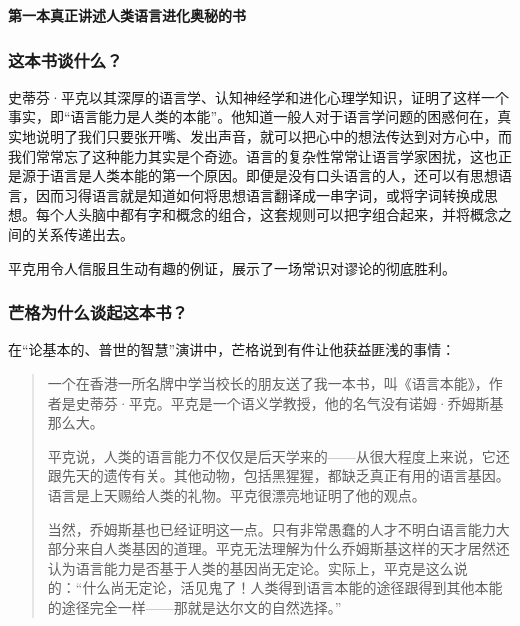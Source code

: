 \cleardoublepage
{}


\begin{BookSummaryBox}
\textbf{第一本真正讲述人类语言进化奥秘的书}
\par
\end{BookSummaryBox}

\subsubsection*{这本书谈什么？}

史蒂芬·平克以其深厚的语言学、认知神经学和进化心理学知识，证明了这样一个事实，即“语言能力是人类的本能”。他知道一般人对于语言学问题的困惑何在，真实地说明了我们只要张开嘴、发出声音，就可以把心中的想法传达到对方心中，而我们常常忘了这种能力其实是个奇迹。语言的复杂性常常让语言学家困扰，这也正是源于语言是人类本能的第一个原因。即便是没有口头语言的人，还可以有思想语言，因而习得语言就是知道如何将思想语言翻译成一串字词，或将字词转换成思想。每个人头脑中都有字和概念的组合，这套规则可以把字组合起来，并将概念之间的关系传递出去。
\par

平克用令人信服且生动有趣的例证，展示了一场常识对谬论的彻底胜利。
\par

\subsubsection*{芒格为什么谈起这本书？}

在“论基本的、普世的智慧”演讲中，芒格说到有件让他获益匪浅的事情：
\par

\begin{quotation}
一个在香港一所名牌中学当校长的朋友送了我一本书，叫《语言本能》，作者是史蒂芬·平克。平克是一个语义学教授，他的名气没有诺姆·乔姆斯基那么大。
\par

平克说，人类的语言能力不仅仅是后天学来的——从很大程度上来说，它还跟先天的遗传有关。其他动物，包括黑猩猩，都缺乏真正有用的语言基因。语言是上天赐给人类的礼物。平克很漂亮地证明了他的观点。
\par

当然，乔姆斯基也已经证明这一点。只有非常愚蠢的人才不明白语言能力大部分来自人类基因的道理。平克无法理解为什么乔姆斯基这样的天才居然还认为语言能力是否基于人类的基因尚无定论。实际上，平克是这么说的：“什么尚无定论，活见鬼了！人类得到语言本能的途径跟得到其他本能的途径完全一样——那就是达尔文的自然选择。”
\par
\end{quotation}

